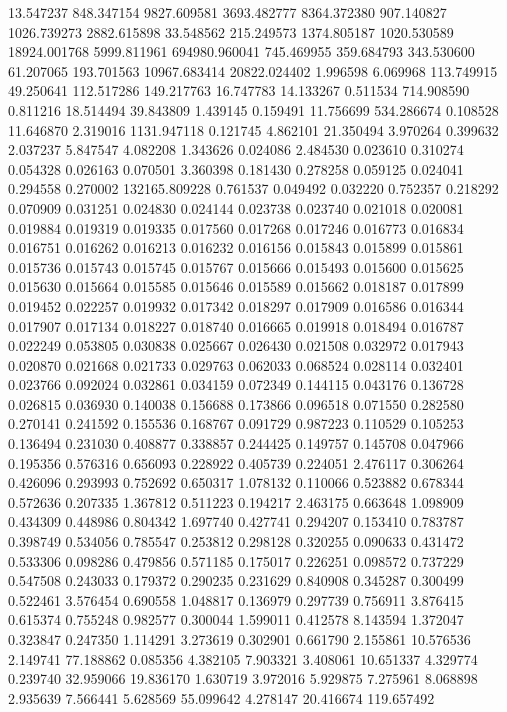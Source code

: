 13.547237
848.347154
9827.609581
3693.482777
8364.372380
907.140827
1026.739273
2882.615898
33.548562
215.249573
1374.805187
1020.530589
18924.001768
5999.811961
694980.960041
745.469955
359.684793
343.530600
61.207065
193.701563
10967.683414
20822.024402
1.996598
6.069968
113.749915
49.250641
112.517286
149.217763
16.747783
14.133267
0.511534
714.908590
0.811216
18.514494
39.843809
1.439145
0.159491
11.756699
534.286674
0.108528
11.646870
2.319016
1131.947118
0.121745
4.862101
21.350494
3.970264
0.399632
2.037237
5.847547
4.082208
1.343626
0.024086
2.484530
0.023610
0.310274
0.054328
0.026163
0.070501
3.360398
0.181430
0.278258
0.059125
0.024041
0.294558
0.270002
132165.809228
0.761537
0.049492
0.032220
0.752357
0.218292
0.070909
0.031251
0.024830
0.024144
0.023738
0.023740
0.021018
0.020081
0.019884
0.019319
0.019335
0.017560
0.017268
0.017246
0.016773
0.016834
0.016751
0.016262
0.016213
0.016232
0.016156
0.015843
0.015899
0.015861
0.015736
0.015743
0.015745
0.015767
0.015666
0.015493
0.015600
0.015625
0.015630
0.015664
0.015585
0.015646
0.015589
0.015662
0.018187
0.017899
0.019452
0.022257
0.019932
0.017342
0.018297
0.017909
0.016586
0.016344
0.017907
0.017134
0.018227
0.018740
0.016665
0.019918
0.018494
0.016787
0.022249
0.053805
0.030838
0.025667
0.026430
0.021508
0.032972
0.017943
0.020870
0.021668
0.021733
0.029763
0.062033
0.068524
0.028114
0.032401
0.023766
0.092024
0.032861
0.034159
0.072349
0.144115
0.043176
0.136728
0.026815
0.036930
0.140038
0.156688
0.173866
0.096518
0.071550
0.282580
0.270141
0.241592
0.155536
0.168767
0.091729
0.987223
0.110529
0.105253
0.136494
0.231030
0.408877
0.338857
0.244425
0.149757
0.145708
0.047966
0.195356
0.576316
0.656093
0.228922
0.405739
0.224051
2.476117
0.306264
0.426096
0.293993
0.752692
0.650317
1.078132
0.110066
0.523882
0.678344
0.572636
0.207335
1.367812
0.511223
0.194217
2.463175
0.663648
1.098909
0.434309
0.448986
0.804342
1.697740
0.427741
0.294207
0.153410
0.783787
0.398749
0.534056
0.785547
0.253812
0.298128
0.320255
0.090633
0.431472
0.533306
0.098286
0.479856
0.571185
0.175017
0.226251
0.098572
0.737229
0.547508
0.243033
0.179372
0.290235
0.231629
0.840908
0.345287
0.300499
0.522461
3.576454
0.690558
1.048817
0.136979
0.297739
0.756911
3.876415
0.615374
0.755248
0.982577
0.300044
1.599011
0.412578
8.143594
1.372047
0.323847
0.247350
1.114291
3.273619
0.302901
0.661790
2.155861
10.576536
2.149741
77.188862
0.085356
4.382105
7.903321
3.408061
10.651337
4.329774
0.239740
32.959066
19.836170
1.630719
3.972016
5.929875
7.275961
8.068898
2.935639
7.566441
5.628569
55.099642
4.278147
20.416674
119.657492
